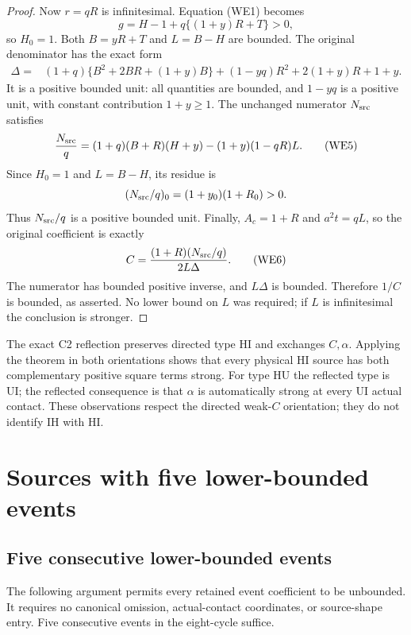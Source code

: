 \begin{proof}
Now $r=qR$ is infinitesimal.  Equation (WE1) becomes
\[
             g=H-1+q\{(1+y)R+T\}>0,
\]
so $H_0=1$.  Both $B=yR+T$ and $L=B-H$ are bounded.
The original denominator has the exact form
\begin{align*}
 \Delta={}&(1+q)\{B^2+2BR+(1+y)B\}
           +(1-yq)R^2+2(1+y)R+1+y.                \tag{WE4}
\end{align*}
It is a positive bounded unit: all quantities are bounded, and
$1-yq$ is a positive unit, with constant contribution $1+y\geq1$.
The unchanged numerator $N_{\rm src}$ satisfies
\[
 \frac{N_{\rm src}}q
  =(1+q)(B+R)(H+y)-(1+y)(1-qR)L.                  \tag{WE5}
\]
Since $H_0=1$ and $L=B-H$, its residue is
\[
       (N_{\rm src}/q)_0=(1+y_0)(1+R_0)>0.
\]
Thus $N_{\rm src}/q$ is a positive bounded unit.  Finally,
$A_c=1+R$ and $a^2t=qL$, so the original coefficient is exactly
\[
          C=\frac{(1+R)(N_{\rm src}/q)}{2L\Delta}.
                                                               \tag{WE6}
\]
The numerator has bounded positive inverse, and $L\Delta$ is
bounded.  Therefore $1/C$ is bounded, as asserted.  No lower bound
on $L$ was required; if $L$ is infinitesimal the conclusion is
stronger.
\end{proof}

The exact C2 reflection preserves directed type HI and exchanges
$C,\alpha$.  Applying the theorem in both orientations shows that
every physical HI source has both complementary positive square terms strong.
For type HU the reflected type is UI; the reflected consequence is
that $\alpha$ is automatically strong at every UI actual contact.
These observations respect the directed weak-$C$ orientation; they
do not identify IH with HI.

\section{Sources with five lower-bounded events}
\subsection{Five consecutive lower-bounded events}
\label{component:p80253fe9bc1b}

\label{p80253fe9bc1b:sec:five-retained-events}

The following argument permits every retained event coefficient to be
unbounded. It requires no canonical omission, actual-contact coordinates,
or source-shape entry. Five consecutive events in the eight-cycle suffice.

